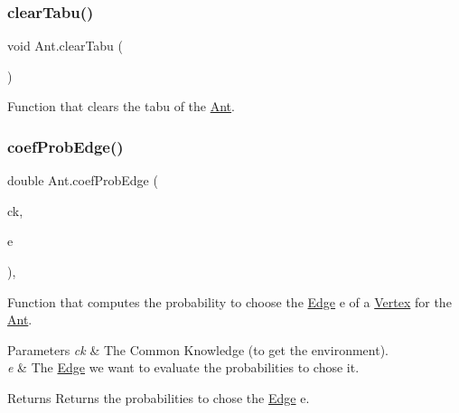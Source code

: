 \subsubsection{\texorpdfstring{clear\+Tabu()}{clearTabu()}}
{\footnotesize\ttfamily void Ant.\+clear\+Tabu (\begin{DoxyParamCaption}{ }\end{DoxyParamCaption})\hspace{0.3cm}{\ttfamily [inline]}}



Function that clears the tabu of the \hyperlink{classAnt}{Ant}. 

\mbox{\label{classAnt_aac4c3a23f5bceee557f55d1834a918e5}} 
\subsubsection{\texorpdfstring{coef\+Prob\+Edge()}{coefProbEdge()}}
{\footnotesize\ttfamily double Ant.\+coef\+Prob\+Edge (\begin{DoxyParamCaption}\item[{\hyperlink{classCommonKnowledge}{Common\+Knowledge}}]{ck,  }\item[{\hyperlink{classEdgeAntColonyData}{Edge\+Ant\+Colony\+Data}}]{e }\end{DoxyParamCaption})\hspace{0.3cm}{\ttfamily [inline]}, {\ttfamily [private]}}



Function that computes the probability to choose the \hyperlink{classEdge}{Edge} \textquotesingle{}e\textquotesingle{} of a \hyperlink{structVertex}{Vertex} for the \hyperlink{classAnt}{Ant}. 


\begin{DoxyParams}{Parameters}
{\em ck} & The Common Knowledge (to get the environment).\\
\hline
{\em e} & The \hyperlink{classEdge}{Edge} we want to evaluate the probabilities to chose it.\\
\hline
\end{DoxyParams}
\begin{DoxyReturn}{Returns}
Returns the probabilities to chose the \hyperlink{classEdge}{Edge} \textquotesingle{}e\textquotesingle{}.
\end{DoxyReturn}
\mbox{\label{classAnt_a21bc4c107d9bbaf840b621ea21ebf385}} 
